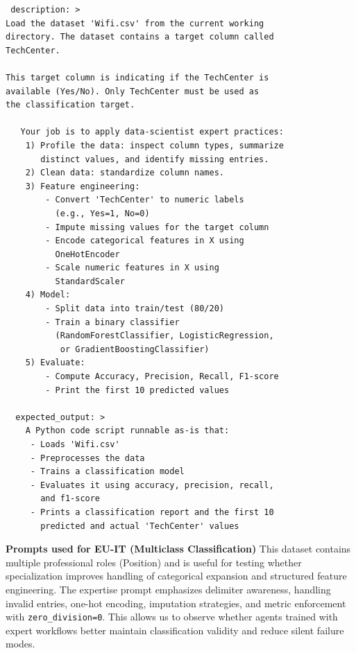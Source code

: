 \begin{tcolorbox}[ left=2pt,   right=2pt,   top=2pt,   bottom=2pt, colback=gray!5,colframe=black!40,title={Expertise instruction prompt}]
\scriptsize
\setlength{\baselineskip}{0.6\baselineskip} \begin{verbatim}
 description: >
Load the dataset 'Wifi.csv' from the current working 
directory. The dataset contains a target column called 
TechCenter.

This target column is indicating if the TechCenter is 
available (Yes/No). Only TechCenter must be used as 
the classification target.
    
   Your job is to apply data-scientist expert practices:
    1) Profile the data: inspect column types, summarize 
       distinct values, and identify missing entries.
    2) Clean data: standardize column names.
    3) Feature engineering:
        - Convert 'TechCenter' to numeric labels 
          (e.g., Yes=1, No=0)
        - Impute missing values for the target column
        - Encode categorical features in X using 
          OneHotEncoder
        - Scale numeric features in X using 
          StandardScaler
    4) Model:
        - Split data into train/test (80/20)
        - Train a binary classifier 
          (RandomForestClassifier, LogisticRegression, 
           or GradientBoostingClassifier)
    5) Evaluate:
        - Compute Accuracy, Precision, Recall, F1-score
        - Print the first 10 predicted values

  expected_output: >
    A Python code script runnable as-is that:
     - Loads 'Wifi.csv'
     - Preprocesses the data
     - Trains a classification model
     - Evaluates it using accuracy, precision, recall, 
       and f1-score
     - Prints a classification report and the first 10 
       predicted and actual 'TechCenter' values
\end{verbatim}
\end{tcolorbox}



\newpage

\textbf{Prompts used for EU-IT (Multiclass Classification)}  
This dataset contains multiple professional roles (Position) and is useful for testing whether specialization improves handling of categorical expansion and structured feature engineering.  
The expertise prompt emphasizes delimiter awareness, handling invalid entries, one-hot encoding, imputation strategies, and metric enforcement with \texttt{zero\_division=0}. This allows us to observe whether agents trained with expert workflows better maintain classification validity and reduce silent failure modes.

